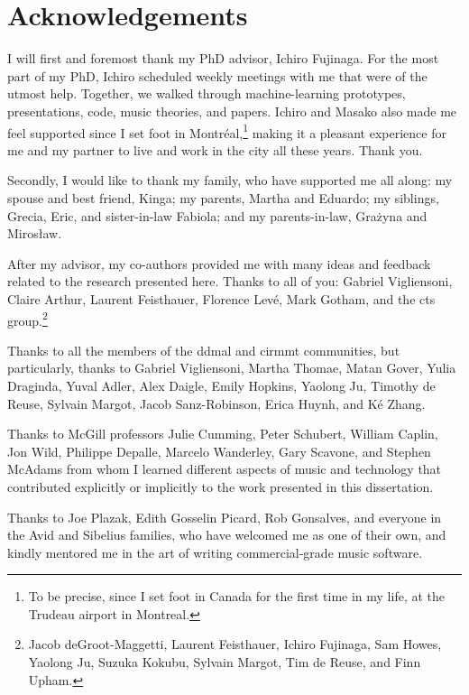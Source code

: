\chapter*{Acknowledgements}
\label{chap:acknowledgements}

I will first and foremost thank my PhD advisor, Ichiro
Fujinaga. For the most part of my PhD, Ichiro scheduled
weekly meetings with me that were of the utmost help.
Together, we walked through machine-learning prototypes,
presentations, code, music theories, and papers. Ichiro and
Masako also made me feel supported since I set foot in
Montr\'eal,\footnote{To be precise, since I set foot in
Canada for the first time in my life, at the Trudeau airport
in Montreal.} making it a pleasant experience for me and my
partner to live and work in the city all these years. Thank
you.

Secondly, I would like to thank my family, who have
supported me all along: my spouse and best friend, Kinga; my
parents, Martha and Eduardo; my siblings, Grecia, Eric, and
sister-in-law Fabiola; and my parents-in-law, Gra\.zyna and
Miros\l{}aw.

After my advisor, my co-authors provided me with many ideas
and feedback related to the research presented here. Thanks
to all of you: Gabriel Vigliensoni, Claire Arthur, Laurent
Feisthauer, Florence Lev\'e, Mark Gotham, and the \gls{cts}
group.\footnote{Jacob deGroot-Maggetti, Laurent Feisthauer,
Ichiro Fujinaga, Sam Howes, Yaolong Ju, Suzuka Kokubu,
Sylvain Margot, Tim de Reuse, and Finn Upham.}

Thanks to all the members of the \gls{ddmal} and
\gls{cirmmt} communities, but particularly, thanks to
Gabriel Vigliensoni, Martha Thomae, Matan Gover, Yulia
Draginda, Yuval Adler, Alex Daigle, Emily Hopkins, Yaolong
Ju, Timothy de Reuse, Sylvain Margot, Jacob Sanz-Robinson,
Erica Huynh, and K\'e Zhang.

Thanks to McGill professors Julie Cumming, Peter Schubert,
William Caplin, Jon Wild, Philippe Depalle, Marcelo
Wanderley, Gary Scavone, and Stephen McAdams from whom I
learned different aspects of music and technology that
contributed explicitly or implicitly to the work presented
in this dissertation.

Thanks to Joe Plazak, Edith Gosselin Picard, Rob Gonsalves,
and everyone in the Avid and Sibelius families, who have
welcomed me as one of their own, and kindly mentored me in
the art of writing commercial-grade music software.

